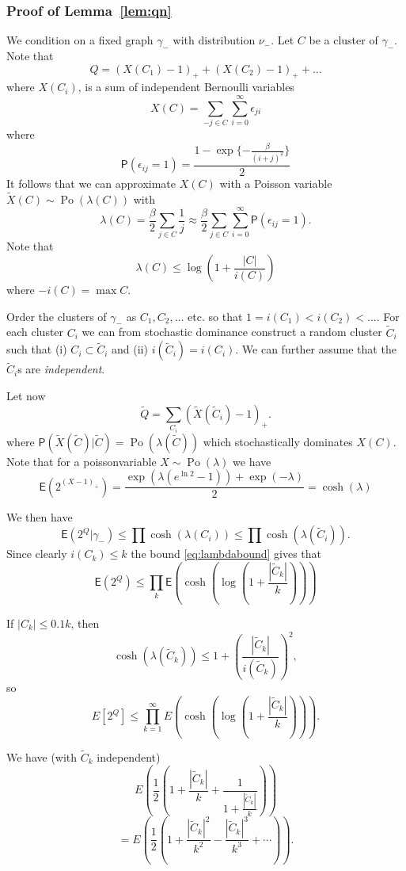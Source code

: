 \documentclass[11pt, a4paper, oneside]{scrartcl}
\theoremstyle{definition}
\theoremstyle{remark}
\providecommand{\opn}{\operatorname}
\providecommand{\E}{\mathsf{E}}
\renewcommand{\P}{\mathsf{P}}
\providecommand{\e}{\epsilon}
\providecommand{\tl}{\tilde}
\providecommand{\g}{\gamma}
\begin{document}
\subsubsection*{Proof of Lemma~\ref{lem:qn}}


We condition on a fixed graph $\g_-$ with distribution $\nu_-$. Let $C$ be a cluster of $\g_-$.
Note that
$$
Q=(X(C_1) -1)_{+} +(X(C_2)-1)_{+} + \ldots
$$
where $X(C_i)$, is a sum of independent Bernoulli variables
$$
X(C) = \sum_{-j\in C} \sum_{i=0}^\infty \e_{ji}
$$
where
$$
\P(\e_{ij}=1) = \frac{1- \exp\{-\frac \beta{(i+j)^2}\}}{2}
$$
It follows that we can approximate $X(C)$ with a Poisson variable
$\tl X(C) \sim \opn{Po}(\lambda(C))$ with
$$
\lambda(C) = \frac{\beta}{2} \sum_{j\in C} \frac 1j
\approx \frac{\beta}{2} \sum_{j\in C} \sum_{i=0}^\infty \P(\e_{ij}=1).
$$
Note that
\begin{equation}
  \label{eq:lambdabound}
    \lambda(C) \leq \log \left(1+\frac{|C|}{i(C)}\right)
\end{equation}
where $-i(C)=\max C$.

Order the clusters of $\g_-$ as $C_1,C_2,\dots$ etc. so that
$1=i(C_1)<i(C_2)<\dots$. For each cluster $C_i$ we can from stochastic dominance
construct a random cluster $\tl C_i$ such that (i) $C_i\subset \tl C_i$ and (ii)
$i(\tl C_i)=i(C_i)$. We can further assume that the $\tl C_i$s are \emph{independent}.

Let now
\[
  \tl Q = \sum_{C_i} (\tl X(\tl C_i) - 1)_+.
\]
where $\P(\tl X(\tl C)| \tl C) = \opn{Po}(\lambda(\tl C))$ which stochastically
dominates $X(C)$. Note that for a poissonvariable $X\sim\opn{Po}(\lambda)$ we have
\[
  \E(2^{(X-1)_+}) = \frac{\exp(\lambda(e^{\ln 2}-1)) + \exp(-\lambda) }{2} = \cosh(\lambda)
\]

We then have
\[
  \E(2^Q | \gamma_- )\leq \prod \cosh (\lambda(C_i))\leq \prod \cosh (\lambda (\tilde C_i)).
\]
Since clearly $i(C_k)\leq k$ the bound \eqref{eq:lambdabound} gives that
\[
  \E(2^Q)\le\prod_k \E\left(\cosh\left( \log\left(1+\frac{|\tilde C_k|}{k}\right)\right)\right)
\]


If $|C_k|\leq 0.1 k$, then
$$\cosh (\lambda (\tilde C_k))\leq 1+\left( \frac{|\tilde C_k|}{i(\tilde C_k)}\right)^2,$$
so
$$E[2^Q]\leq \prod_{k=1}^\infty E \left(\cosh \left(\log \left(1+\frac{|\tilde C_k |}{k} \right) \right) \right).$$




We have (with $\tilde C_k$ independent)
$$E\left(\frac{1}{2}(1+\frac{|\tilde C_k|}{k}+\frac{1}{1+\frac{|\tilde C_k|}{k}}) \right)$$
$$=E\left(\frac{1}{2}(1+\frac{|\tilde C_k|^2}{k^2}-\frac{|\tilde C_k|^3}{k^3}+\cdots )\right).$$
\end{document}
